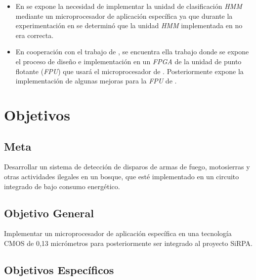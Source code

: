\begin{itemize}
\item {En \cite{Carlosthesis} se expone la necesidad de implementar la unidad de clasificación \textit{HMM} mediante un microprocesador de aplicación específica ya que durante la experimentación en \cite{mio} se determinó que la unidad \textit{HMM} implementada en \cite{Lalfaro} no era correcta.}

\item En cooperación con el trabajo de \cite{Carlosthesis}, se encuentra ella trabajo \cite{Diego2015} donde se expone el proceso de diseño e implementación en un \textit{FPGA} de la unidad de punto flotante (\textit{FPU}) que usará el microprocesador de \cite{Carlosthesis}. Posteriormente \cite{Francis2016} expone la implementación de algunas mejoras para la \textit{FPU} de \cite{Diego2015}.

\end{itemize}

\section{Objetivos}

\subsection{Meta}

Desarrollar un sistema de detección de disparos de armas de fuego, motosierras y otras actividades ilegales en un bosque, que esté implementado en un circuito integrado de bajo consumo energético.

\subsection{Objetivo General}

Implementar un microprocesador de aplicación específica en una tecnología CMOS de 0,13 micrómetros para posteriormente ser integrado al proyecto SiRPA.


\subsection{Objetivos Específicos}

